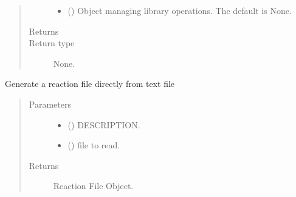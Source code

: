 \documentclass[letterpaper,10pt,english]{sphinxmanual}
\begin{document}
\begin{fulllineitems}
\begin{fulllineitems}
\begin{quote}
\begin{description}
\begin{itemize}
\item {} 
\sphinxAtStartPar
{} ({\hyperref[\detokenize{api/initobjects:libmanager.LibManager}]{}}\sphinxstyleliteralemphasis{\sphinxupquote{, }}) \textendash{} Object managing library operations. The default is None.

\end{itemize}

\item[{Returns}] \leavevmode
\sphinxAtStartPar


\item[{Return type}] \leavevmode
\sphinxAtStartPar
None.

\end{description}\end{quote}

\end{fulllineitems}


\begin{fulllineitems}
\label{\detokenize{api/inputgeneration:parsersD1S.ReactionFile.from_text}}
\sphinxAtStartPar
Generate a reaction file directly from text file
\begin{quote}\begin{description}
\item[{Parameters}] \leavevmode\begin{itemize}
\item {} 
\sphinxAtStartPar
{} () \textendash{} DESCRIPTION.

\item {} 
\sphinxAtStartPar
{} () \textendash{} file to read.

\end{itemize}

\item[{Returns}] \leavevmode
\sphinxAtStartPar
Reaction File Object.


\end{description}
\end{quote}
\end{fulllineitems}
\end{fulllineitems}
\end{document}
